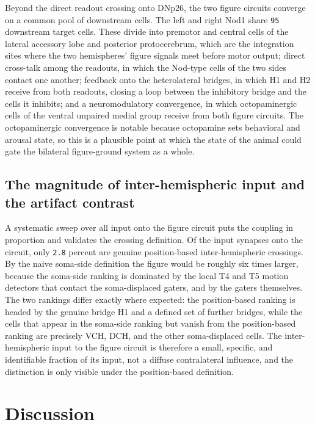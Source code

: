\documentclass[11pt]{article}
\newcommand{\rid}[1]{\texttt{\small #1}}
\begin{document}
Beyond the direct readout crossing onto DNp26, the two figure circuits converge on a common pool
of downstream cells. The left and right Nod1 share \rid{95} downstream target cells. These divide
into premotor and central cells of the lateral accessory lobe and posterior protocerebrum, which
are the integration sites where the two hemispheres' figure signals meet before motor output;
direct cross-talk among the readouts, in which the Nod-type cells of the two sides contact one
another; feedback onto the heterolateral bridges, in which H1 and H2 receive from both readouts,
closing a loop between the inhibitory bridge and the cells it inhibits; and a neuromodulatory
convergence, in which octopaminergic cells of the ventral unpaired medial group receive from both
figure circuits. The octopaminergic convergence is notable because octopamine sets behavioral and
arousal state, so this is a plausible point at which the state of the animal could gate the
bilateral figure-ground system as a whole.

\subsection{The magnitude of inter-hemispheric input and the artifact contrast}

A systematic sweep over all input onto the figure circuit puts the coupling in proportion and
validates the crossing definition. Of the input synapses onto the circuit, only \rid{2.8} percent
are genuine position-based inter-hemispheric crossings. By the naive soma-side definition the
figure would be roughly six times larger, because the soma-side ranking is dominated by the local
T4 and T5 motion detectors that contact the soma-displaced gaters, and by the gaters themselves.
The two rankings differ exactly where expected: the position-based ranking is headed by the
genuine bridge H1 and a defined set of further bridges, while the cells that appear in the
soma-side ranking but vanish from the position-based ranking are precisely VCH, DCH, and the other
soma-displaced cells. The inter-hemispheric input to the figure circuit is therefore a small,
specific, and identifiable fraction of its input, not a diffuse contralateral influence, and the
distinction is only visible under the position-based definition.

\section{Discussion}
\end{document}
